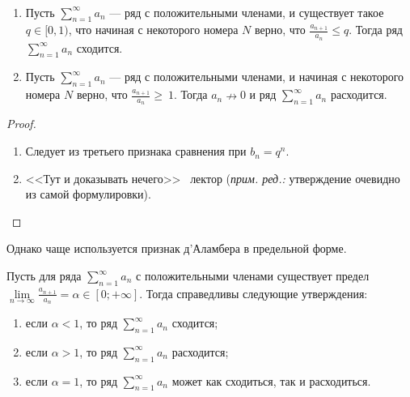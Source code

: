 \begin{Test}\
		\begin{enumerate}
		\item 	Пусть $\sum\limits_{n=1}^{\infty} a_n$ --- ряд с положительными членами, и существует такое $q \in [0, 1)$, что начиная с некоторого номера $N$ верно, что $\frac{a_{n+1}}{a_n} \leqslant q$. Тогда ряд $\sum\limits_{n=1}^{\infty} a_n$ сходится.
		\item Пусть $\sum\limits_{n=1}^{\infty} a_n$ --- ряд с положительными членами, и начиная с некоторого номера $N$ верно, что $\frac{a_{n+1}}{a_n} \geqslant~1$. Тогда $a_n \nrightarrow 0$ и ряд $\sum\limits_{n=1}^{\infty} a_n$ расходится.
	\end{enumerate}
\end{Test}

\begin{proof}
\ 
\begin{enumerate}
	\item 	Следует из третьего признака сравнения при $b_n = q^n$. 
	\item <<Тут и доказывать нечего>> \textcopyright\ лектор (\textit{прим. ред.:} утверждение очевидно из самой формулировки).
\end{enumerate}
\end{proof}

Однако чаще используется признак д'Аламбера в предельной форме.

\begin{Consequence}
Пусть для ряда $\sum\limits_{n=1}^{\infty} a_n$ с положительными членами существует предел $\lim\limits_{n\rightarrow\infty} \frac{a_{n+1}}{a_n} = \alpha \in [0; +\infty]$. Тогда справедливы следующие утверждения:
\begin{enumerate}
	\item если $\alpha < 1$, то ряд $\sum\limits_{n=1}^{\infty} a_n$ сходится;
	\item если $\alpha > 1$, то ряд $\sum\limits_{n=1}^{\infty} a_n$ расходится;
	\item если $\alpha = 1$, то ряд $\sum\limits_{n=1}^{\infty} a_n$ может как сходиться, так и расходиться. 
\end{enumerate}
\end{Consequence}


